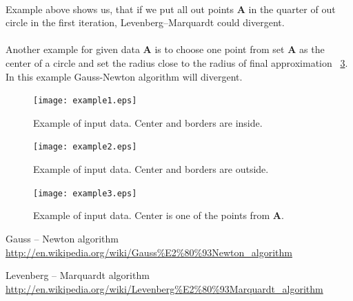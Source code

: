 \documentclass[]{scrartcl}
\begin{document}
  \paragraph{} Example above shows us, that if we put all out points  $ \mathbf{A} $  in the quarter of out circle in the first iteration, Levenberg–Marquardt could divergent. 	
  \paragraph{} Another example for given data $ \mathbf{A} $ is to choose one point from set $ \mathbf{A} $ as the center of a circle and set the radius close to the radius of final approximation ~\ref{fig:example3}. In this example Gauss-Newton algorithm will divergent. 
  
  
   \begin{figure}[h]
   	\centering
   	\texttt{[image: example1.eps]}
   	\caption{Example of input data. Center and borders are inside.}
   	\label{fig:example1}
   \end{figure}
     \begin{figure}[h]
     	\centering
     	\texttt{[image: example2.eps]}
     	\caption{Example of input data. Center and borders are outside.}
     	\label{fig:example2}
     \end{figure}
          \begin{figure}[h]
          	\centering
          	\texttt{[image: example3.eps]}
          	\caption{Example of input data. Center is one of the points from   $ \mathbf{A} $.}
          	\label{fig:example3}
          \end{figure}
   
  
\newpage
\begin{thebibliography}{1}
	Gauss – Newton algorithm
	\url{http://en.wikipedia.org/wiki/Gauss%E2%80%93Newton_algorithm}
		

	Levenberg – Marquardt algorithm
	\url{http://en.wikipedia.org/wiki/Levenberg%E2%80%93Marquardt_algorithm}
	
\end{thebibliography}
 
\end{document}
